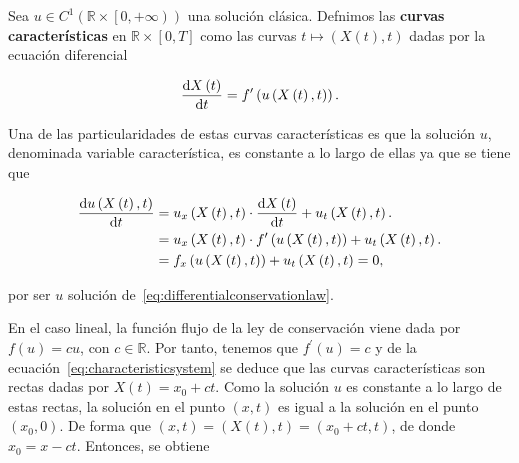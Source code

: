 \begin{definition}
  Sea
  \begin{math}
    u\in C^{1}
    \left(
    \mathbb{R}\times
    \left[0,+\infty\right)
    \right)
  \end{math}
  una solución clásica.
  Defnimos las \textbf{curvas características} en
  \begin{math}
    \mathbb{R}\times
    \left[0,T\right]
  \end{math}
  como las curvas
  \begin{math}
    t\longmapsto
    \left(
    X\left(t\right),t
    \right)
  \end{math}
  dadas por la ecuación diferencial

  \begin{equation}\label{eq:characteristicsystem}
    \diff{X\left(t\right)}{t}=
    f^{\prime}
    \left(
    u\left(X\left(t\right),t\right)
    \right).
  \end{equation}
\end{definition}

Una de las particularidades de estas curvas características es que la
solución $u$, denominada variable característica, es constante a lo
largo de ellas ya que se tiene que

\begin{align*}
  \diff{
    u
    \left(
    X\left(t\right),t
    \right)
  }{t} & =
  u_{x}
  \left(
  X\left(t\right),t
  \right)\cdot
  \diff{X\left(t\right)}{t}+
  u_{t}
  \left(
  X\left(t\right),t
  \right). \\
       & =
  u_{x}
  \left(
  X\left(t\right),t
  \right)\cdot
  f^{\prime}
  \left(
  u\left(X\left(t\right),t\right)
  \right)+
  u_{t}
  \left(
  X\left(t\right),t
  \right). \\
       & =
  f_{x}
  \left(
  u\left(X\left(t\right),t\right)
  \right)+
  u_{t}
  \left(
  X\left(t\right),t
  \right)=
  0,
\end{align*}

por ser $u$ solución de~\eqref{eq:differentialconservationlaw}.

En el caso lineal, la función flujo de la ley de conservación viene
dada por $f\left(u\right)=cu$, con $c\in\mathbb{R}$.
Por tanto, tenemos que $f^{\prime}\left(u\right)=c$ y de la
ecuación~\eqref{eq:characteristicsystem} se deduce que las curvas
características son rectas dadas por $X\left(t\right)=x_{0}+ct$.
Como la solución $u$ es constante a lo largo de estas rectas, la
solución en el punto $\left(x,t\right)$ es igual a la solución en el
punto $\left(x_{0},0\right)$.
De forma que
\begin{math}
  \left(x,t\right)=
  \left(
  X\left(t\right),t
  \right)=
  \left(x_0+ct,t\right)
\end{math},
de donde $x_{0}=x-ct$.
Entonces, se obtiene

